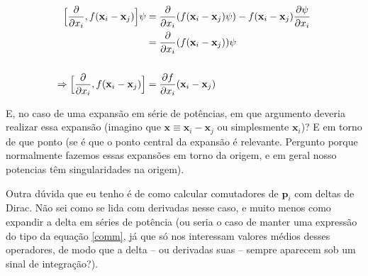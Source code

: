 \documentclass[12pt]{article}
\begin{document}
\begin{equation}
  \begin{aligned}
	\Bigl[ \frac{\partial}{\partial x_i},f(\mathbf{x}_i-\mathbf{x}_j) \Bigl]\psi & = \frac{\partial}{\partial x_i}(f(\mathbf{x}_i-\mathbf{x}_j)\psi) - f(\mathbf{x}_i-\mathbf{x}_j)\frac{\partial \psi}{\partial x_i} \\
	& = \frac{\partial}{\partial x_i}(f(\mathbf{x}_i-\mathbf{x}_j))\psi \\ \\
	\Rightarrow \Bigl[ \frac{\partial}{\partial x_i},f(\mathbf{x}_i-\mathbf{x}_j) \Bigl] & = \frac{\partial f}{\partial x_i}(\mathbf{x}_i-\mathbf{x}_j)
  \end{aligned} \label{comm}
\end{equation}

E, no caso de uma expansão em série de potências, em que argumento deveria realizar essa expansão (imagino que $\mathbf{x} \equiv \mathbf{x}_i-\mathbf{x}_j$ ou simplesmente $\mathbf{x}_i$)? E em torno de que ponto (se é que o ponto central da expansão é relevante. Pergunto porque normalmente fazemos essas expansões em torno da origem, e em geral nosso potencias têm singularidades na origem).

Outra dúvida que eu tenho é de como calcular comutadores de $\mathbf{p}_i$ com deltas de Dirac. Não sei como se lida com derivadas nesse caso, e muito menos como expandir a delta em séries de potência (ou seria o caso de manter uma expressão do tipo da equação \ref{comm}, já que só nos interessam valores médios desses operadores, de modo que a delta -- ou derivadas suas -- sempre aparecem sob um sinal de integração?). 
\end{document}
